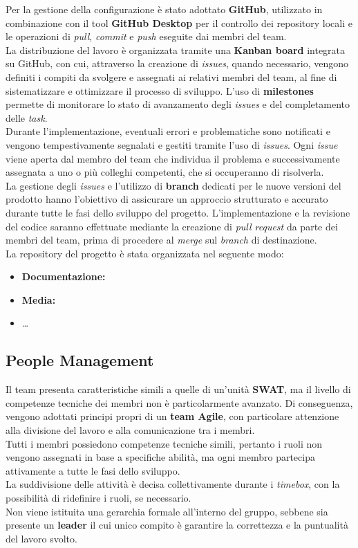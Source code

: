\documentclass[a4paper,12pt]{article}
\begin{document}
Per la gestione della configurazione è stato adottato \textbf{GitHub}, utilizzato in combinazione con il tool \textbf{GitHub Desktop} per il controllo dei repository locali e le operazioni di \emph{pull}, \emph{commit} e \emph{push} eseguite dai membri del team. \\ 
La distribuzione del lavoro è organizzata tramite una \textbf{Kanban board} integrata su GitHub, con cui, attraverso la creazione di \emph{issues}, quando necessario, vengono definiti i compiti da svolgere e assegnati ai relativi membri del team, al fine di sistematizzare e ottimizzare il processo di sviluppo.  
L’uso di \textbf{milestones} permette di monitorare lo stato di avanzamento degli \emph{issues} e del completamento delle \emph{task}.  \\
Durante l'implementazione, eventuali errori e problematiche sono notificati e vengono tempestivamente segnalati e gestiti tramite l'uso di \emph{issues}. Ogni \emph{issue} viene aperta dal membro del team che individua il problema e successivamente assegnata a uno o più colleghi competenti, che si occuperanno di risolverla.  \\
La gestione degli \emph{issues} e l’utilizzo di \textbf{branch} dedicati per le nuove versioni del prodotto hanno l’obiettivo di assicurare un approccio strutturato e accurato durante tutte le fasi dello sviluppo del progetto.  
L’implementazione e la revisione del codice saranno effettuate mediante la creazione di \emph{pull request} da parte dei membri del team, prima di procedere al \emph{merge} sul \emph{branch} di destinazione.\\
La repository del progetto è stata organizzata nel seguente modo:
\begin{itemize}
    \item \textbf{Documentazione:} 
    \item \textbf{Media:} 
    \item \dots
\end{itemize}

\subsection{People Management}

Il team presenta caratteristiche simili a quelle di un'unità \textbf{SWAT}, ma il livello di competenze tecniche dei membri non è particolarmente avanzato.  
Di conseguenza, vengono adottati principi propri di un \textbf{team Agile}, con particolare attenzione alla divisione del lavoro e alla comunicazione tra i membri.  \\
Tutti i membri possiedono competenze tecniche simili, pertanto i ruoli non vengono assegnati in base a specifiche abilità, ma ogni membro partecipa attivamente a tutte le fasi dello sviluppo.\\  
La suddivisione delle attività è decisa collettivamente durante i \emph{timebox}, con la possibilità di ridefinire i ruoli, se necessario.  \\
Non viene istituita una gerarchia formale all'interno del gruppo, sebbene sia presente un \textbf{leader} il cui unico compito è garantire la correttezza e la puntualità del lavoro svolto.
\newpage
\end{document}
